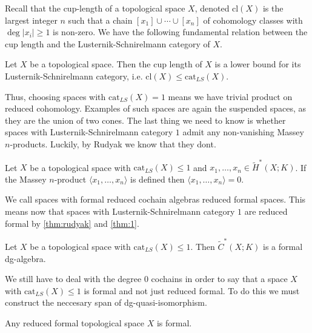 Recall that the cup-length of a topological space 
$X$, denoted $\text{cl}(X)$ is the largest integer $n$ such that a chain 
$[x_1]\cup \cdots \cup [x_n]$ of cohomology classes with $\deg|x_i|\geq 1$ is non-zero. 
We have the following fundamental relation between the cup length and the 
Lusternik-Schnirelmann category of $X$.

\begin{lemma}
    Let $X$ be a topological space. Then the cup length of $X$ is a lower bound for its 
    Lusternik-Schnirelmann category, i.e. $\text{cl}(X)\leq \text{cat}_{LS}(X)$.    
\end{lemma}

Thus, choosing spaces with $\text{cat}_{LS}(X) = 1$ means we have trivial product on 
reduced cohomology. Examples of such spaces are again the suspended spaces, as they are 
the union of two cones. The last thing we need to know is whether spaces with 
Lusternik-Schnirelmann category $1$ admit any non-vanishing Massey  $n$-products. Luckily, 
by Rudyak we know that they dont.

\begin{theorem}
    \label{thm:rudyak}
    Let $X$ be a topological space with $\text{cat}_{LS}(X)\leq 1$ and 
    $x_1, \ldots, x_n \in \widetilde{H}^\ast(X;K)$. If the Massey $n$-product 
    $\langle x_1, \ldots, x_n\rangle$ is defined then 
    $\langle x_1, \ldots, x_n\rangle = 0$.    
\end{theorem}

We call spaces with formal reduced cochain algebras reduced formal spaces. This means now
that spaces with Lusternik-Schnirelmann category $1$ are reduced formal by 
\cref{thm:rudyak} and \cref{thm:1}. 

\begin{corollary}
    \label{cor:reduced_formal}
    Let $X$ be a topological space with $\text{cat}_{LS}(X)\leq 1$. Then 
    $\widetilde{C}^\ast(X;K)$ is a formal dg-algebra. 
\end{corollary}

We still have to deal with the degree $0$ cochains in order to say that a space $X$ with
$\text{cat}_{LS}(X)\leq 1$ is formal and not just reduced formal. To do this we must 
construct the neccesary span of dg-quasi-isomorphism.

\begin{theorem}
    \label{thm:reduced_formal_formal}
    Any reduced formal topological space $X$ is formal.     
\end{theorem}

